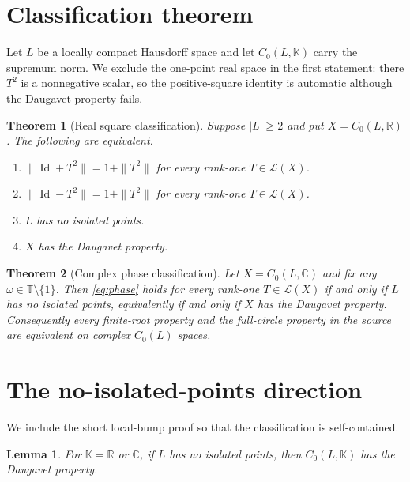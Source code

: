 \documentclass[11pt]{article}
\newtheorem{theorem}{Theorem}
\newtheorem{lemma}{Lemma}
\theoremstyle{remark}
\newcommand{\K}{\mathbb K}
\newcommand{\T}{\mathbb T}
\newcommand{\Id}{\operatorname{Id}}
\begin{document}
\section{Classification theorem}

Let $L$ be a locally compact Hausdorff space and let $C_0(L,\K)$ carry the
supremum norm.  We exclude the one-point real space in the first statement:
there $T^2$ is a nonnegative scalar, so the positive-square identity is
automatic although the Daugavet property fails.

\begin{theorem}[Real square classification]\label{thm:real}
Suppose $|L|\ge2$ and put $X=C_0(L,\mathbb R)$.  The following are equivalent.
\begin{enumerate}
\item $\|\Id+T^2\|=1+\|T^2\|$ for every rank-one $T\in\mathcal L(X)$.
\item $\|\Id-T^2\|=1+\|T^2\|$ for every rank-one $T\in\mathcal L(X)$.
\item $L$ has no isolated points.
\item $X$ has the Daugavet property.
\end{enumerate}
\end{theorem}

\begin{theorem}[Complex phase classification]\label{thm:complex}
Let $X=C_0(L,\mathbb C)$ and fix any $\omega\in\T\setminus\{1\}$.  Then
\eqref{eq:phase} holds for every rank-one $T\in\mathcal L(X)$ if and only if
$L$ has no isolated points, equivalently if and only if $X$ has the Daugavet
property.  Consequently every finite-root property and the full-circle
property in the source are equivalent on complex $C_0(L)$ spaces.
\end{theorem}

\section{The no-isolated-points direction}

We include the short local-bump proof so that the classification is
self-contained.

\begin{lemma}\label{lem:daugavet}
For $\K=\mathbb R$ or $\mathbb C$, if $L$ has no isolated points, then
$C_0(L,\K)$ has the Daugavet property.
\end{lemma}
\end{document}
